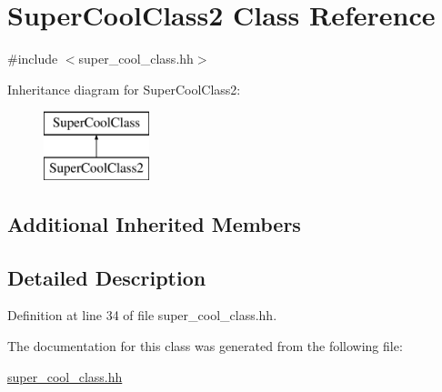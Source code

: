 \hypertarget{class_super_cool_class2}{}\section{Super\+Cool\+Class2 Class Reference}
\label{class_super_cool_class2}


{\ttfamily \#include $<$super\+\_\+cool\+\_\+class.\+hh$>$}

Inheritance diagram for Super\+Cool\+Class2\+:\begin{figure}[H]
\begin{center}
\leavevmode
\includegraphics[height=2.000000cm]{class_super_cool_class2}
\end{center}
\end{figure}
\subsection*{Additional Inherited Members}


\subsection{Detailed Description}


Definition at line 34 of file super\+\_\+cool\+\_\+class.\+hh.



The documentation for this class was generated from the following file\+:\begin{DoxyCompactItemize}
\item 
\hyperlink{super__cool__class_8hh}{super\+\_\+cool\+\_\+class.\+hh}\end{DoxyCompactItemize}
